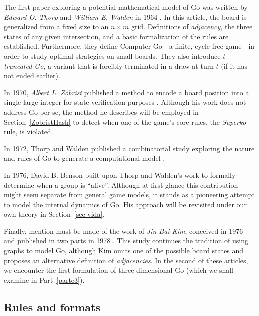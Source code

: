 The first paper exploring a potential mathematical model of Go was written by \textit{Edward O. Thorp} and \textit{William E. Walden} in 1964 \cite{TandW64}. In this article, the board is generalized from a fixed size to an \(n \times m\) grid. Definitions of \textit{adjacency}, the three states of any given intersection, and a basic formalization of the rules are established. Furthermore, they define Computer Go---a finite, cycle-free game---in order to study optimal strategies on small boards. They also introduce \textit{\(t\)-truncated Go}, a variant that is forcibly terminated in a draw at turn \(t\) (if it has not ended earlier).

In 1970, \textit{Albert L. Zobrist} published a method to encode a board position into a single large integer for state-verification purposes \cite{zobrist1970hashing}. Although his work does not address Go per se, the method he describes will be employed in Section~\ref{ZobristHash} to detect when one of the game's core rules, the \textit{Superko} rule, is violated.

In 1972, Thorp and Walden published a combinatorial study exploring the nature
and rules of Go to generate a computational model \cite{TandW72}.

In 1976, David B. Benson \cite{Benson} built upon Thorp and Walden's work to formally determine when a group is ``alive''. Although at first glance this contribution might seem separate from general game models, it stands as a pioneering attempt to model the internal dynamics of Go. His approach will be revisited under our own theory in Section~\ref{sec-vida}.

Finally, mention must be made of the work of \textit{Jin Bai Kim}, conceived in 1976 and published in two parts in 1978 \cite{KJB1, KJB2}. This study continues the tradition of using graphs to model Go, although Kim omits one of the possible board states and proposes an alternative definition of \textit{adjacencies}. In the second of these articles, we encounter the first formulation of three-dimensional Go (which we shall examine in Part~\ref{parte3}).

\subsection{Rules and formats}

